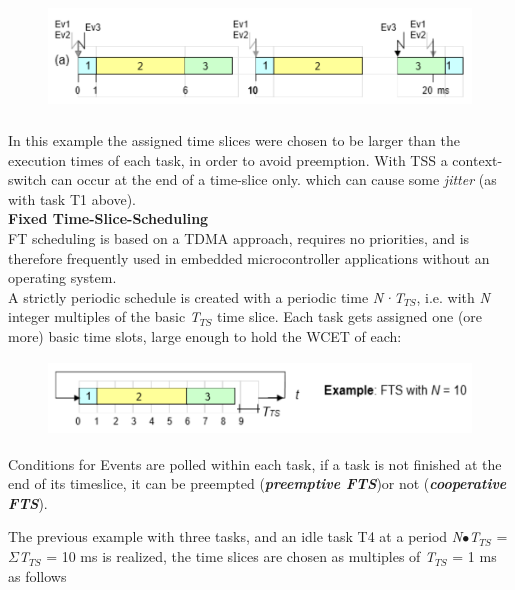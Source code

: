 	\begin{figure}[h]
    \centering
    \includegraphics[width=13cm, height=3cm]{Images/image91.png}
    \label{fig:Fig 36}
    \end{figure}

In this example the assigned time slices were chosen to be larger than the execution times of each task, in order to avoid preemption. With TSS a context-switch can occur at the end of a time-slice only. which can cause some \textit{jitter} (as with task T1 above).\\

{\rot\bf Fixed Time-Slice-Scheduling }\\

FT scheduling is based on a TDMA approach, requires no priorities, and is therefore frequently used in embedded microcontroller applications without an operating system.\\

A strictly periodic schedule is created with a periodic time \textit{N·T${}_{TS}$}, i.e. with \textit{N} integer multiples of the basic \textit{T${}_{TS}$} time slice. Each task gets assigned one (ore more) basic time slots, large enough to hold the WCET of each:\\

	\begin{figure}[h]
    \centering
    \includegraphics[width=12cm, height=2cm]{Images/image92.png}
    \label{fig:Fig 37}
    \end{figure}

Conditions for Events are polled within each task, if a task is not finished at the end of its timeslice, it can be preempted (\textbf{\textit{preemptive FTS}})or not (\textbf{\textit{cooperative FTS}}).\\
\os{\newpage}

The previous example with three tasks, and an idle task T4 at a period \textit{N}$\mathrm{\bullet}$\textit{T${}_{TS}$} = $\Sigma$\textit{T${}_{TS}$} = 10 ms is realized, the time slices are chosen as multiples of \textit{T${}_{TS}$} = 1 ms as follows \\

